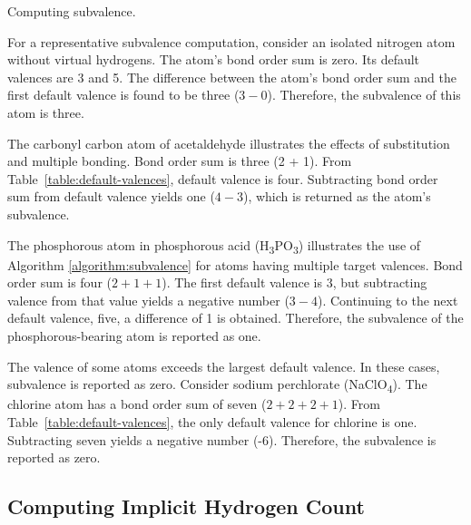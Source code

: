 \documentclass{article}
\begin{document}
\begin{algorithm}
    \caption{Computing subvalence.}
    \label{algorithm:subvalence}
    
\end{algorithm}

For a representative subvalence computation, consider an isolated nitrogen atom without virtual hydrogens. The atom's bond order sum is zero. Its default valences are 3 and 5. The difference between the atom's bond order sum and the first default valence is found to be three ($3 - 0$). Therefore, the subvalence of this atom is three.

The carbonyl carbon atom of acetaldehyde illustrates the effects of substitution and multiple bonding. Bond order sum is three (2 + 1). From Table~\ref{table:default-valences}, default valence is four. Subtracting bond order sum from default valence yields one ($4 - 3$), which is returned as the atom's subvalence.

The phosphorous atom in phosphorous acid (H\textsubscript{3}PO\textsubscript{3}) illustrates the use of Algorithm \ref{algorithm:subvalence} for atoms having multiple target valences. Bond order sum is four ($2 + 1 + 1$). The first default valence is 3, but subtracting valence from that value yields a negative number ($3 - 4$). Continuing to the next default valence, five, a difference of 1 is obtained. Therefore, the subvalence of the phosphorous-bearing atom is reported as one.

The valence of some atoms exceeds the largest default valence. In these cases, subvalence is reported as zero. Consider sodium perchlorate (NaClO\textsubscript{4}). The chlorine atom has a bond order sum of seven ($2 + 2 + 2 + 1$). From Table~\ref{table:default-valences}, the only default valence for chlorine is one. Subtracting seven yields a negative number (-6). Therefore, the subvalence is reported as zero.

\subsection*{Computing Implicit Hydrogen Count}
\label{computing-implicit-hydrogen-count}
\end{document}
